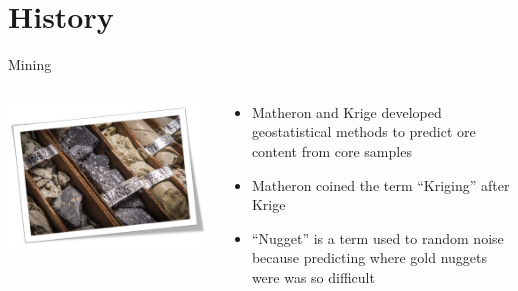 \documentclass[
  ignorenonframetext,
]{beamer}
\providecommand{\tightlist}{%
  \setlength{\itemsep}{0pt}\setlength{\parskip}{0pt}}\usepackage{longtable,booktabs,array}
\begin{document}
\section{History}\label{history}

\begin{frame}{Mining}
\label{mining}
\begin{columns}[T]
\begin{column}{0.5\textwidth}
\includegraphics{../../presentations/20240222_UNC_ESE_Guest_Lecture/mining.jpg}
\end{column}

\begin{column}{0.5\textwidth}
\begin{itemize}
\tightlist
\item
  Matheron and Krige developed geostatistical methods to predict ore
  content from core samples
\item
  Matheron coined the term ``Kriging'' after Krige
\item
  ``Nugget'' is a term used to random noise because predicting where
  gold nuggets were was so difficult
\end{itemize}
\end{column}
\end{columns}
\end{frame}
\end{document}
